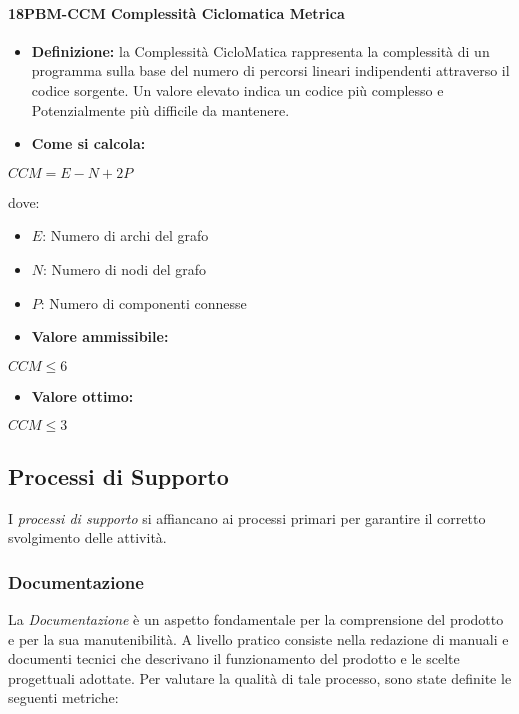 \paragraph*{18PBM-CCM Complessità Ciclomatica Metrica}
\begin{itemize}
    \item \textbf{Definizione:} la Complessità CicloMatica rappresenta la complessità di un programma sulla base del numero di percorsi lineari indipendenti attraverso il codice sorgente. Un valore elevato indica un codice più complesso e  Potenzialmente più difficile da mantenere.
    \item \textbf{Come si calcola:}
\end{itemize}
\begin{center}
   $CCM = E - N + 2P$ 
\end{center}
dove:
\begin{itemize}[label=$\rightarrow$]
    \item $E$: Numero di archi del grafo
    \item $N$: Numero di nodi del grafo
    \item $P$: Numero di componenti connesse
\end{itemize}
\begin{itemize}
    \item \textbf{Valore ammissibile:}
\end{itemize}
\begin{center}
    $CCM \leq 6$
\end{center}
\begin{itemize}
    \item \textbf{Valore ottimo:}
\end{itemize}
\begin{center}
    $CCM \leq 3$
\end{center}

\subsection{Processi di Supporto}
I \emph{processi di supporto} si affiancano ai processi primari per garantire il corretto svolgimento delle attività.
\subsubsection{Documentazione}
La \emph{Documentazione} è un aspetto fondamentale per la comprensione del prodotto e per la sua manutenibilità. A livello pratico consiste nella redazione di manuali e documenti tecnici
che descrivano il funzionamento del prodotto e le scelte progettuali adottate. Per valutare la qualità di tale processo, sono state definite le seguenti metriche:

